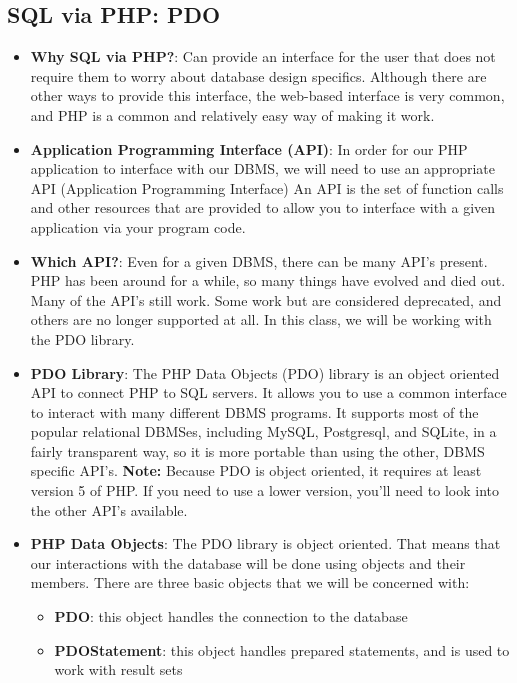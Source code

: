 \documentclass{report}
\begin{document}
    \pagebreak 
    \subsection{SQL via PHP: PDO}
    \begin{itemize}
        \item \textbf{Why SQL via PHP?}: Can provide an interface for the user that does not require them to worry about database design specifics.
            \bigbreak \noindent 
            Although there are other ways to provide this interface, the web-based interface is very common, and PHP is a common and relatively easy way of making it work.
        \item \textbf{Application Programming Interface (API)}: In order for our PHP application to interface with our DBMS, we will need to use an appropriate API (Application Programming Interface) An API is the set of function calls and other resources that are provided to allow you to interface with a given application via your program code.
        \item \textbf{Which API?}: Even for a given DBMS, there can be many API's present. PHP has been around for a while, so many things have evolved and died out. Many of the API's still work. Some work but are considered deprecated, and others are no longer supported at all. In this class, we will be working with the PDO library.
        \item \textbf{PDO Library}: The PHP Data Objects (PDO) library is an object oriented API to connect PHP to SQL servers. It allows you to use a common interface to interact with many different DBMS programs.
            \bigbreak \noindent 
            It supports most of the popular relational DBMSes, including MySQL, Postgresql, and SQLite, in a fairly transparent way, so it is more portable than using the other, DBMS specific API's.
            \textbf{Note:} Because PDO is object oriented, it requires at least version 5 of PHP. If you need to use a lower version, you'll need to look into the other API's available.
        \item \textbf{PHP Data Objects}: The PDO library is object oriented. That means that our interactions with the database will be done using objects and their members. There are three basic objects that we will be concerned with:
            \begin{itemize}
                \item \textbf{PDO}: this object handles the connection to the database
                \item \textbf{PDOStatement}: this object handles prepared statements, and is used to work with result sets

\end{itemize}
\end{itemize}
\end{document}

